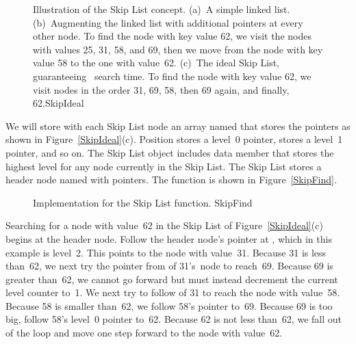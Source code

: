 \begin{figure}
\vspace{-\smallskipamount}
{Illustration of the Skip List concept.
(a)~A simple linked list.
(b)~Augmenting the linked list with additional pointers at every other
node.
To find the node with key value 62, we visit the nodes with values
25, 31, 58, and 69, then we move from the node with key value 58 to
the one with value~62.
(c)~The ideal Skip List, guaranteeing \Ologn\ search time.
To find the node with key value 62, we visit nodes in the order
31, 69, 58, then 69 again, and finally, 62.}{SkipIdeal}
\bigskip
\end{figure}

We will store with each Skip List node an array
named  that stores the pointers as shown in
Figure~\ref{SkipIdeal}(c).
Position  stores a level~0 pointer,
 stores a level~1 pointer, and so on.
The Skip List object includes data member  that
stores the highest level for any node currently in the Skip List.
The Skip List stores a header node named  with
 pointers.
The  function is shown in Figure~\ref{SkipFind}.

\begin{figure}
\vspace{-\bigskipamount}
\vspace{-\medskipamount}
{Implementation for the Skip List  function.}
{SkipFind}
\vspace{-\medskipamount}
\end{figure}

Searching for a node with value~62 in the
Skip List of Figure~\ref{SkipIdeal}(c) begins at the header node.
Follow the header node's pointer at
, which in this example is level~2.
This points to the node with value~31.
Because 31 is less than~62, we next try the pointer from
 of 31's~node to reach~69.
Because 69 is greater than~62, we cannot go forward but must
instead decrement the current level counter to~1.
We next try to follow  of 31 to reach the node with
value~58.
Because 58 is smaller than~62, we follow 58's
 pointer to~69.
Because 69 is too big, follow 58's level~0 pointer
to~62.
Because 62 is not less than~62, we fall out of the  loop
and move one step forward to the node with value~62.

